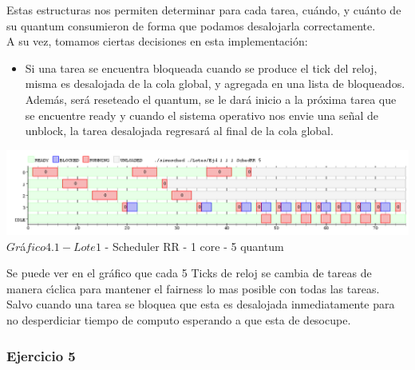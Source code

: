 Estas estructuras nos permiten determinar para cada tarea, cuándo, y cuánto 
de su quantum consumieron de forma que podamos desalojarla correctamente.\\

A su vez, tomamos ciertas decisiones en esta implementación:
\begin{itemize}
 \item Si una tarea se encuentra bloqueada cuando se produce el tick del reloj, misma es desalojada
de la cola global, y agregada en una lista de bloqueados. Además, ser\'{a} reseteado el quantum, se le
dará inicio a la próxima tarea que se encuentre ready y cuando el sistema operativo nos envie una
señal de unblock, la tarea desalojada regresará al final de la cola global.

\end{itemize}

\begin{center}

    
	\includegraphics[width=450pt]{./Test/Ej4.png}
	{$Gr$\'a$fico 4.1 - Lote 1$ - Scheduler RR - 1 core - 5 quantum}	
 
\end{center}

Se puede ver en el gr\'{a}fico que cada 5 Ticks de reloj se cambia de tareas de manera c\'{\i}clica para mantener 
el fairness lo mas posible con todas las tareas. Salvo cuando una tarea se bloquea que esta es desalojada inmediatamente 
para no desperdiciar tiempo de computo esperando a que esta de desocupe.

\subsubsection[Resolución Ejercicio 5]{Ejercicio 5}

